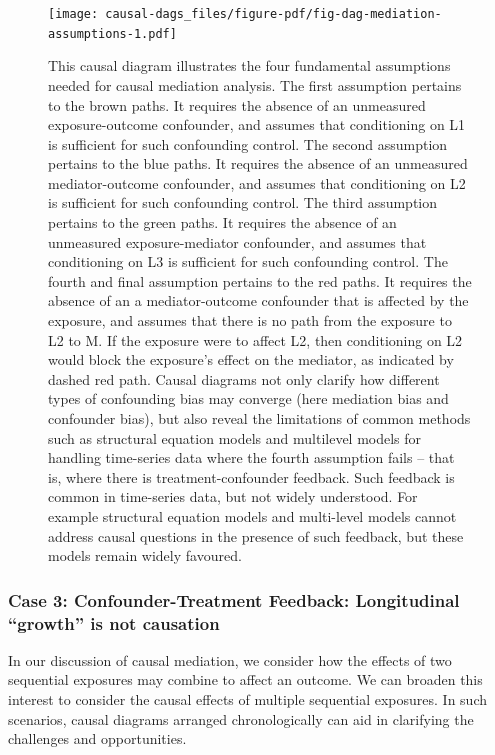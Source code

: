 \documentclass[
  singlecolumn,
  9pt]{article}
\begin{document}
\begin{figure}

{\centering \texttt{[image: causal-dags\_files/figure-pdf/fig-dag-mediation-assumptions-1.pdf]}

}

\caption{\label{fig-dag-mediation-assumptions}This causal diagram
illustrates the four fundamental assumptions needed for causal mediation
analysis. The first assumption pertains to the brown paths. It requires
the absence of an unmeasured exposure-outcome confounder, and assumes
that conditioning on L1 is sufficient for such confounding control. The
second assumption pertains to the blue paths. It requires the absence of
an unmeasured mediator-outcome confounder, and assumes that conditioning
on L2 is sufficient for such confounding control. The third assumption
pertains to the green paths. It requires the absence of an unmeasured
exposure-mediator confounder, and assumes that conditioning on L3 is
sufficient for such confounding control. The fourth and final assumption
pertains to the red paths. It requires the absence of an a
mediator-outcome confounder that is affected by the exposure, and
assumes that there is no path from the exposure to L2 to M. If the
exposure were to affect L2, then conditioning on L2 would block the
exposure's effect on the mediator, as indicated by dashed red path.
Causal diagrams not only clarify how different types of confounding bias
may converge (here mediation bias and confounder bias), but also reveal
the limitations of common methods such as structural equation models and
multilevel models for handling time-series data where the fourth
assumption fails -- that is, where there is treatment-confounder
feedback. Such feedback is common in time-series data, but not widely
understood. For example structural equation models and multi-level
models cannot address causal questions in the presence of such feedback,
but these models remain widely favoured.}

\end{figure}

\subsubsection{Case 3: Confounder-Treatment Feedback: Longitudinal
``growth'' is not
causation}\label{case-3-confounder-treatment-feedback-longitudinal-growth-is-not-causation}

In our discussion of causal mediation, we consider how the effects of
two sequential exposures may combine to affect an outcome. We can
broaden this interest to consider the causal effects of multiple
sequential exposures. In such scenarios, causal diagrams arranged
chronologically can aid in clarifying the challenges and opportunities.
\end{document}

